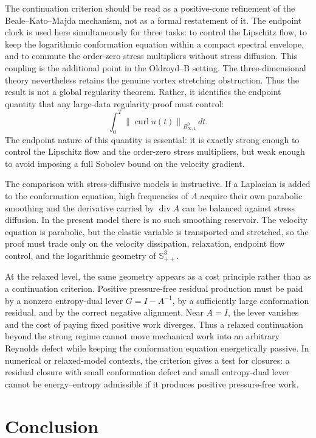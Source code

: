\documentclass[10pt,a4paper]{amsart}
\numberwithin{equation}{section}
\newcommand{\Id}{I}
\newcommand{\Spp}{\mathbb S_{++}}
\newcommand{\divv}{\operatorname{div}}
\newcommand{\curl}{\operatorname{curl}}
\newcommand{\norm}[1]{\left\lVert #1\right\rVert}
\begin{document}
The continuation criterion should be read as a positive-cone refinement of the
Beale--Kato--Majda mechanism, not as a formal restatement of it.  The endpoint
clock is used here simultaneously for three tasks: to control the Lipschitz
flow, to keep the logarithmic conformation equation within a compact spectral
envelope, and to commute the order-zero stress multipliers without stress
diffusion.  This coupling is the additional point in the Oldroyd--B setting.
The three-dimensional theory nevertheless retains the genuine vortex stretching
obstruction.  Thus the result is not a global regularity theorem.  Rather, it
identifies the endpoint quantity that any large-data regularity proof must
control:
\[
  \int_0^T\norm{\curl u(t)}_{B^0_{\infty,1}}\,dt.
\]
The endpoint nature of this quantity is essential: it is exactly strong enough
to control the Lipschitz flow and the order-zero stress multipliers, but weak
enough to avoid imposing a full Sobolev bound on the velocity gradient.

The comparison with stress-diffusive models is instructive.  If a Laplacian is
added to the conformation equation, high frequencies of \(A\) acquire their own
parabolic smoothing and the derivative carried by \(\divv A\) can be balanced
against stress diffusion.  In the present model there is no such smoothing
reservoir.  The velocity equation is parabolic, but the elastic variable is
transported and stretched, so the proof must trade only on the velocity
dissipation, relaxation, endpoint flow control, and the logarithmic geometry of
\(\Spp^3\).

At the relaxed level, the same geometry appears as a cost principle rather
than as a continuation criterion.  Positive pressure-free residual production
must be paid by a nonzero entropy-dual lever \(G=\Id-A^{-1}\), by a sufficiently
large conformation residual, and by the correct negative alignment.  Near
\(A=\Id\), the lever vanishes and the cost of paying fixed positive work
diverges.  Thus a relaxed continuation beyond the strong regime cannot move
mechanical work into an arbitrary Reynolds defect while keeping the
conformation equation energetically passive.  In numerical or relaxed-model
contexts, the criterion gives a test for closures: a residual closure with
small conformation defect and small entropy-dual lever cannot be
energy--entropy admissible if it produces positive pressure-free work.

\section{Conclusion}
\end{document}
